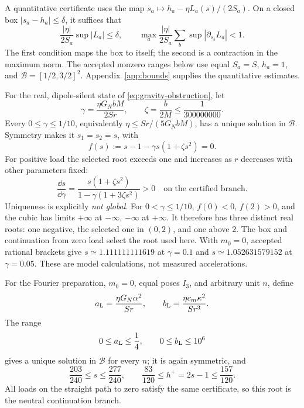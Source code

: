 A quantitative certificate uses the map \(s_a\mapsto h_a-\eta L_a(s)/(2S_a)\). On a closed box \(|s_a-h_a|\le\delta\), it suffices that
\begin{equation}
 \frac{|\eta|}{2S_a}\sup|L_a|\le\delta,\qquad
 \max_a\frac{|\eta|}{2S_a}\sum_b\sup|\partial_{s_b}L_a|<1.
 \label{eq:contraction}
\end{equation}
The first condition maps the box to itself; the second is a contraction in the maximum norm. The accepted nonzero ranges below use equal \(S_a=S\), \(h_a=1\), and
\(\mathcal B=[1/2,3/2]^2\). Appendix~\ref{app:bounds} supplies the quantitative estimates.

For the real, dipole-silent state of \eqref{eq:gravity-obstruction}, let
\begin{equation}
 \gamma=\frac{\eta G_NbM}{2Sr},\qquad \zeta=\frac{b}{2M}\le\frac1{300000000}.
 \label{eq:gravity-load}
\end{equation}
Every \(0\le\gamma\le1/10\), equivalently
\(\eta\le Sr/(5G_NbM)\), has a unique solution in \(\mathcal B\). Symmetry makes it \(s_1=s_2=s\), with
\begin{equation}
 f(s):=s-1-\gamma s(1+\zeta s^2)=0.
 \label{eq:gravity-cubic}
\end{equation}
For positive load the selected root exceeds one and increases as \(r\) decreases with other parameters fixed:
\[
 \frac{\dd s}{\dd\gamma}
 =\frac{s(1+\zeta s^2)}{1-\gamma(1+3\zeta s^2)}>0
 \quad\text{on the certified branch}.
\]
Uniqueness is explicitly \emph{not global}. For \(0<\gamma\le1/10\), \(f(0)<0\), \(f(2)>0\), and the cubic has limits \(+\infty\) at \(-\infty\), \(-\infty\) at \(+\infty\). It therefore has three distinct real roots: one negative, the selected one in \((0,2)\), and one above \(2\). The box and continuation from zero load select the root used here. With \(m_0=0\), accepted rational brackets give \(s\simeq1.111111111619\) at \(\gamma=0.1\) and \(s\simeq1.052631579152\) at \(\gamma=0.05\). These are model calculations, not measured accelerations.

For the Fourier preparation, \(m_0=0\), equal poses \(I_3\), and arbitrary unit \(n\), define
\begin{equation}
 a_{\rm L}=\frac{\eta G_N\alpha^2}{Sr},\qquad
 b_{\rm L}=\frac{\eta c_m\kappa^2}{Sr^3}.
 \label{eq:loads}
\end{equation}
The range
\begin{equation}
 0\le a_{\rm L}\le\frac14,\qquad 0\le b_{\rm L}\le10^6
 \label{eq:mag-box-range}
\end{equation}
gives a unique solution in \(\mathcal B\) for every \(n\); it is again symmetric, and
\begin{equation}
 \frac{203}{240}\le s\le\frac{277}{240},\qquad
 \frac{83}{120}\le h^+=2s-1\le\frac{157}{120}.
 \label{eq:positive-range}
\end{equation}
All loads on the straight path to zero satisfy the same certificate, so this root is the neutral continuation branch.

